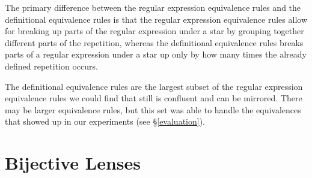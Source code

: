 \documentclass[numbers,10pt,preprint\ifanon ,nocopyrightspace\fi]{sigplanconf}
\begin{document}
The primary difference between the regular expression equivalence rules and the
definitional equivalence rules is that the regular expression equivalence
rules allow for breaking up parts of the regular expression under a star by
grouping together different parts of the repetition, whereas the definitional
equivalence rules breaks parts of a regular expression under a star up only by
how many times the already defined repetition occurs.

The definitional equivalence rules are the largest subset of the regular
expression equivalence rules we could
find that still is confluent and can be mirrored.  There may be larger equivalence rules,
but this set was able to handle the equivalences that showed up in  our
experiments (see \S\ref{evaluation}).

\section{Bijective Lenses}
\end{document}
